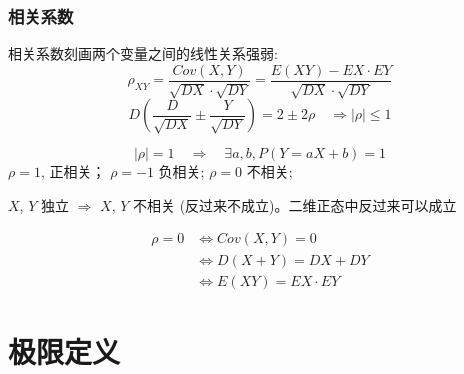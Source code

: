 \documentclass[10pt, a4paper]{article}
\begin{document}
    \subsubsection{相关系数}
        相关系数刻画两个变量之间的线性关系强弱:
        $$\rho_{XY} = \frac{Cov(X, Y)}{\sqrt{DX}\cdot\sqrt{DY}} = \frac{E(XY) - EX\cdot EY}{\sqrt{DX}\cdot\sqrt{DY}}$$ 
        $$D(\frac{D}{\sqrt{DX}} \pm \frac{Y}{\sqrt{DY}}) = 2 \pm 2\rho \quad \Rightarrow |\rho| \leqslant 1$$

        $$|\rho| = 1 \quad \Rightarrow \quad \exists a, b, P(Y = aX + b) = 1$$
        $\rho = 1$, 正相关； $\rho = -1$ 负相关; $\rho = 0$ 不相关;
        
        $X$, $Y$ 独立 $\Rightarrow$ $X$, $Y$ 不相关 (反过来不成立)。二维正态中反过来可以成立

        \begin{align*}
            \rho = 0 &\Leftrightarrow Cov(X, Y) = 0\\ 
                    &\Leftrightarrow D(X + Y) = DX + DY \\
                    &\Leftrightarrow E(XY) = EX\cdot EY
        \end{align*}

        \newpage
\section{极限定义}
        
\end{document}
